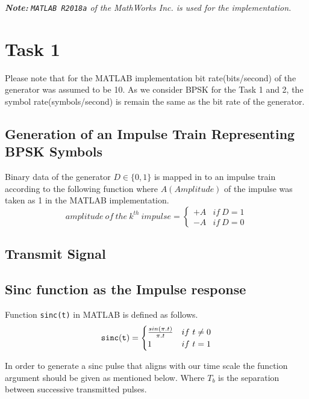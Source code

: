 \documentclass[a4paper,11pt]{article}%
\begin{document}


\tableofcontents
\listoffigures
\listoftables
\vfill


\begin{center}
	\textit{\textbf{Note:}}
\textit{{\tt MATLAB R2018a} of the MathWorks Inc. is used for the implementation.}
\end{center}
\pagebreak

\section{Task 1}

Please note that for the MATLAB implementation bit rate(bits/second) of the generator was assumed to be 10. As we consider BPSK for the Task 1 and 2, the symbol rate(symbols/second) is remain the same as the bit rate of the generator.

\subsection{Generation of an Impulse Train Representing BPSK Symbols}
Binary data of the generator $D \in \{0, 1\}$ is mapped in to an impulse train according to the following function where $A(Amplitude)$  of the impulse was taken as 1 in the MATLAB implementation.
\[
amplitude ~of~ the~ k^{th}~ impulse = \begin{cases}
	+A & if~ D = 1\\
	-A & if~ D = 0
\end{cases}
\]

\subsection{Transmit Signal}
\subsection{Sinc function as the Impulse response}

Function {\tt sinc(t)} in MATLAB is defined as follows. 
\[
{\tt sinc(t)} = \begin{cases}
	\frac{sin(\pi.t)}{\pi.t} & if~t \neq 0\\
	1 & if~ t = 1
\end{cases}
\]

In order to generate  a sinc pulse that aligns with our time scale the function argument should be given as mentioned below. Where $T_b$ is the separation between
successive transmitted pulses.
\end{document}

